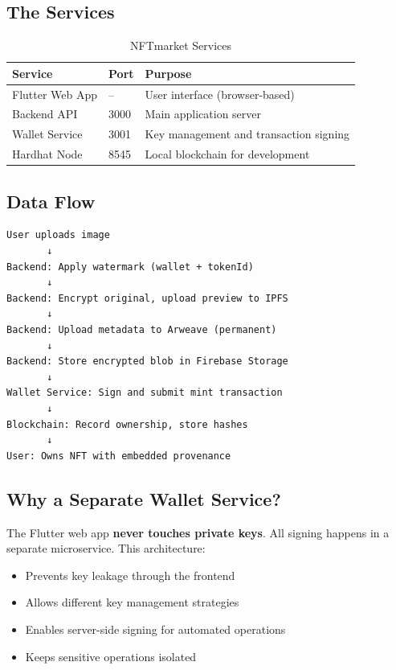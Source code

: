 \documentclass[11pt,a4paper]{article}
\begin{document}
\subsection{The Services}

\begin{table}[h]
\centering
\begin{tabular}{@{}lll@{}}
\toprule
\textbf{Service} & \textbf{Port} & \textbf{Purpose} \\
\midrule
Flutter Web App & -- & User interface (browser-based) \\
Backend API & 3000 & Main application server \\
Wallet Service & 3001 & Key management and transaction signing \\
Hardhat Node & 8545 & Local blockchain for development \\
\bottomrule
\end{tabular}
\caption{NFTmarket Services}
\end{table}

\subsection{Data Flow}

\begin{mdframed}[style=codeblock]
\begin{verbatim}
User uploads image
       ↓
Backend: Apply watermark (wallet + tokenId)
       ↓
Backend: Encrypt original, upload preview to IPFS
       ↓
Backend: Upload metadata to Arweave (permanent)
       ↓
Backend: Store encrypted blob in Firebase Storage
       ↓
Wallet Service: Sign and submit mint transaction
       ↓
Blockchain: Record ownership, store hashes
       ↓
User: Owns NFT with embedded provenance
\end{verbatim}
\end{mdframed}

\subsection{Why a Separate Wallet Service?}

The Flutter web app \textbf{never touches private keys}. All signing happens in a separate microservice. This architecture:

\begin{itemize}
    \item Prevents key leakage through the frontend
    \item Allows different key management strategies
    \item Enables server-side signing for automated operations
    \item Keeps sensitive operations isolated
\end{itemize}
\end{document}
